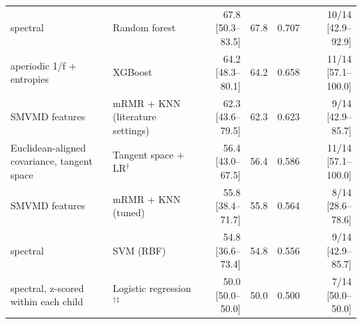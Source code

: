 \begin{tabular}{llrrrr}
spectral & Random forest & 67.8 [50.3--83.5] & 67.8 & 0.707 & 10/14 [42.9--92.9] \\
aperiodic 1/f + entropies & XGBoost & 64.2 [48.3--80.1] & 64.2 & 0.658 & 11/14 [57.1--100.0] \\
SMVMD features & mRMR + KNN (literature settings) & 62.3 [43.6--79.5] & 62.3 & 0.623 & 9/14 [42.9--85.7] \\
Euclidean-aligned covariance, tangent space & Tangent space + LR$^\dagger$ & 56.4 [43.0--67.5] & 56.4 & 0.586 & 11/14 [57.1--100.0] \\
SMVMD features & mRMR + KNN (tuned) & 55.8 [38.4--71.7] & 55.8 & 0.564 & 8/14 [28.6--78.6] \\
spectral & SVM (RBF) & 54.8 [36.6--73.4] & 54.8 & 0.556 & 9/14 [42.9--85.7] \\
spectral, z-scored within each child & Logistic regression$^\dagger$$^\ddagger$ & 50.0 [50.0--50.0] & 50.0 & 0.500 & 7/14 [50.0--50.0] \\
\hline
\end{tabular}
